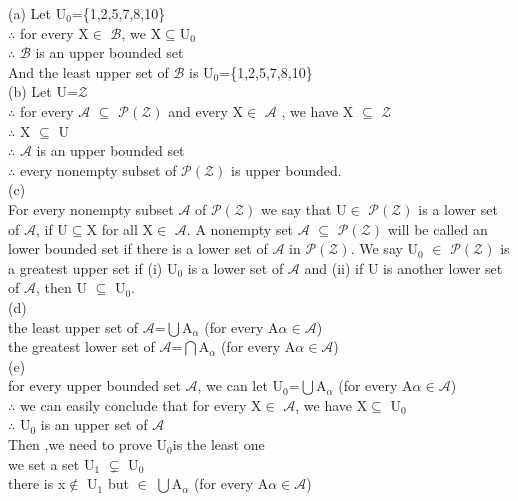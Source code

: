 \documentclass[11pt, a4paper, UTF8]{ctexart}
\begin{document}
\begin{solution}
(a) Let U$_0$=\{1,2,5,7,8,10\}\\
$\therefore$ for every X$\in$ $\mathcal{B}$, we X$\subseteq$U$_0$\\
$\therefore$ $\mathcal{B}$ is an upper bounded set\\
And the least upper set of $\mathcal{B}$ is U$_0$=\{1,2,5,7,8,10\}\\
(b) Let U=$\mathcal{Z}$\\
$\therefore$ for every $\mathcal{A}$ $\subseteq$ $\mathcal{P(Z)}$ and every X$\in$ $\mathcal{A}$ , we have X $\subseteq$ $\mathcal{Z}$\\
$\therefore$ X $\subseteq$ U\\
$\therefore$ $\mathcal{A}$ is an upper bounded set\\
$\therefore$ every nonempty subset of $\mathcal{P(Z)}$ is upper bounded.\\
(c) \\
For every nonempty subset $\mathcal{A}$ of $\mathcal{P(Z)}$ we say that U$\in$ $\mathcal{P(Z)}$ is a lower set of $\mathcal{A}$, if U$\subseteq$X for all X$\in$ $\mathcal{A}$. A nonempty set $\mathcal{A}$ $\subseteq$ $\mathcal{P(Z)}$ will be called an lower bounded set if there is a lower set of $\mathcal{A}$ in $\mathcal{P(Z)}$. We say U$_0$ $\in$ $\mathcal{P(Z)}$ is a greatest upper set if (i) U$_0$ is a lower set of $\mathcal{A}$ and (ii) if U is another lower set of $\mathcal{A}$, then U $\subseteq$ U$_0$.\\
(d)\\
the least upper set of $\mathcal{A}$=$\bigcup$A$_\alpha$ (for every A$\alpha$$\in$$\mathcal{A}$)\\
the greatest lower set of $\mathcal{A}$=$\bigcap$A$_\alpha$ (for every A$\alpha$$\in$$\mathcal{A}$)\\
(e)\\
for every upper bounded set $\mathcal{A}$, we can let U$_0$=$\bigcup$A$_\alpha$ (for every A$\alpha$$\in$$\mathcal{A}$)\\
$\therefore$ we can easily conclude that for every X$\in$ $\mathcal{A}$, we have X$\subseteq$ U$_0$\\
$\therefore$ U$_0$ is an upper set of $\mathcal{A}$\\
Then ,we need to prove U$_0$is the least one\\
we set a set U$_1$ $\subsetneq$ U$_0$\\
there is x$\notin$ U$_1$ but $\in$ $\bigcup$A$_\alpha$ (for every A$\alpha$$\in$$\mathcal{A}$)\\

\end{solution}
\end{document}
